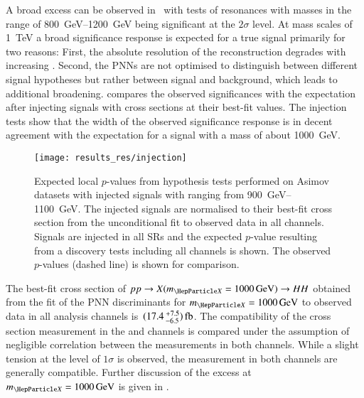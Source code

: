 A broad excess can be observed in~ with tests of
resonances with masses in the range of \SIrange{800}{1200}{\GeV} being
significant at the $2\sigma$ level. At mass scales of \SI{1}{\TeV} a broad
significance response is expected for a true signal primarily for two reasons:
First, the absolute resolution of the \mHH reconstruction degrades with
increasing \mX. Second, the PNNs are not optimised to distinguish between
different signal hypotheses but rather between signal and background, which
leads to additional broadening.  compares the
observed significances with the expectation after injecting signals with cross
sections at their best-fit values. The injection tests show that the width of
the observed significance response is in decent agreement with the expectation
for a signal with a mass of about \SI{1000}{\GeV}.

\begin{figure}[htbp]
  \centering

  \texttt{[image: results\_res/injection]}

  \caption{Expected local $p$-values from hypothesis tests performed on Asimov
    datasets with injected signals with \mX ranging from
    \SIrange{900}{1100}{\GeV}. The injected signals are normalised to their
    best-fit cross section from the unconditional fit to observed data in all
    channels.  Signals are injected in all SRs and the expected $p$-value
    resulting from a discovery tests including all channels is shown. The
    observed $p$-values (dashed line) is shown for comparison.}%
  \label{fig:local_pvalues_injected}
\end{figure}

The best-fit cross section of $pp \to X(\mX = \SI{1000}{\GeV}) \to HH$ obtained
from the fit of the PNN discriminants for $\mX = \SI{1000}{\GeV}$ to observed
data in all analysis channels
is~$(\num{17.4}\valuesep^{\hspace{0.25pt}+\hspace{0.25pt}7.5}_{-6.5})\valuesep\si{\femto\barn}$. The
compatibility of the cross section measurement in the \hadhad and \lephad
channels is compared under the assumption of negligible correlation between the
measurements in both channels.
While a slight tension at the level of $1\sigma$ is observed, the measurement in
both channels are generally compatible. Further discussion of the excess at
$\mX = \SI{1000}{\GeV}$ is given in
.

